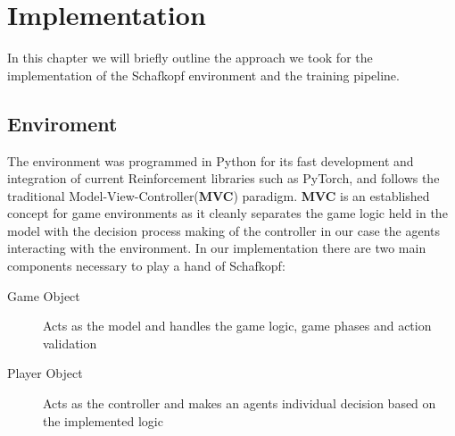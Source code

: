 \chapter{Implementation}
In this chapter we will briefly outline the approach we took for the implementation of the Schafkopf environment and
the training pipeline.


\section{Enviroment}
The environment was programmed in Python for its fast development and integration of current Reinforcement libraries
such as PyTorch, and follows the traditional Model-View-Controller(\textbf{MVC}) paradigm.
\textbf{MVC} is an established concept for game environments as it cleanly separates the game logic held in the
model
with the decision process making of the controller in our case the agents interacting with the environment.
In our implementation there are two main components necessary to play a hand of Schafkopf:
\begin{description}
    \item[Game Object] Acts as the model and handles the game logic, game phases and action validation
    \item[Player Object] Acts as the controller and makes an agents individual decision based on the implemented logic
\end{description}

